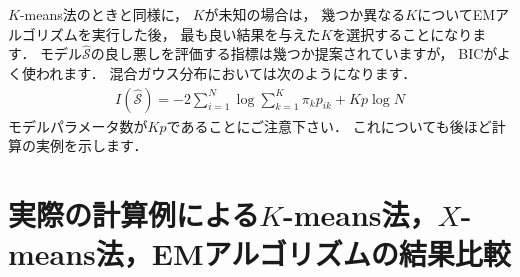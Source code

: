 ﻿\documentclass{jsarticle}
\begin{document}
$K$-means法のときと同様に，
$K$が未知の場合は，
幾つか異なる$K$についてEMアルゴリズムを実行した後，
最も良い結果を与えた$K$を選択することになります．
モデル$\hat{\mathcal{S}}$の良し悪しを評価する指標は幾つか提案されていますが，
BICがよく使われます．
混合ガウス分布においては次のようになります．
\begin{align*}
I(\hat{\mathcal{S}})=-2\sum_{i=1}^{N}\log\sum_{k=1}^{K}\pi_{k}p_{ik}+Kp\log N
\end{align*}
モデルパラメータ数が$Kp$であることにご注意下さい．
これについても後ほど計算の実例を示します．


\section{実際の計算例による$K$-means法，$X$-means法，EMアルゴリズムの結果比較}
\end{document}
